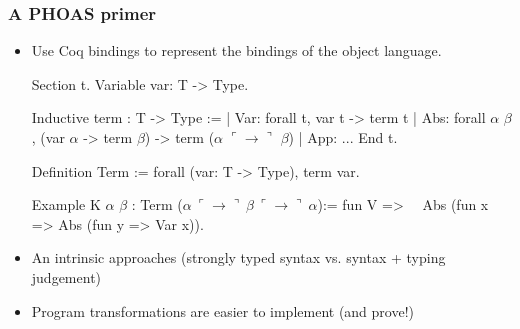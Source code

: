 \documentclass[9pt]{beamer}
\begin{document}
\phoasprimer{
}
\begin{frame}[fragile]
  \frametitle{A PHOAS primer}
  \begin{itemize}
  \item Use Coq bindings to represent the bindings of the object language.
    \newcommand\arrow{\ulcorner \to \urcorner}
\begin{coq}
Section t. 
  Variable var: T -> Type.
  
  Inductive term : T -> Type :=
  | Var: forall t, var t -> term t
  | Abs: forall $\alpha$ $\beta$, (var $\alpha$ -> term $\beta$) -> term ($\alpha$ $\arrow$ $\beta$)
  | App: ...
End t. 

Definition Term := forall (var: T -> Type), term var. 

Example K $\alpha$ $\beta$ : Term ($\alpha~\arrow{}~\beta{}~\arrow{}~\alpha$):= fun V =>
$\quad$Abs (fun x => Abs (fun y => Var x)).
\end{coq}

\pause

\item An \alert{intrinsic approaches} (strongly typed syntax vs. syntax + typing judgement)
\item Program transformations are easier to implement (and prove!) 
\end{itemize}
\end{frame}


\end{document}
